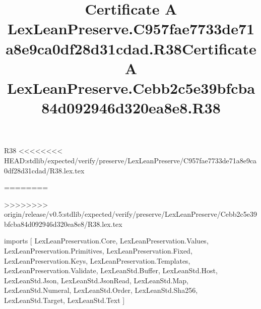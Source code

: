 \begin{lexlean}{R38}
<<<<<<<< HEAD:stdlib/expected/verify/preserve/LexLeanPreserve/C957fae7733de71a8e9ca0df28d31cdad/R38.lex.tex
\title{Certificate A LexLeanPreserve.C957fae7733de71a8e9ca0df28d31cdad.R38}
========
\title{Certificate A LexLeanPreserve.Cebb2c5e39bfcba84d092946d320ea8e8.R38}
>>>>>>>> origin/release/v0.5:stdlib/expected/verify/preserve/LexLeanPreserve/Cebb2c5e39bfcba84d092946d320ea8e8/R38.lex.tex
\begin{coremodule}
imports [
  LexLeanPreservation.Core,
  LexLeanPreservation.Values,
  LexLeanPreservation.Primitives,
  LexLeanPreservation.Fixed,
  LexLeanPreservation.Keys,
  LexLeanPreservation.Templates,
  LexLeanPreservation.Validate,
  LexLeanStd.Buffer,
  LexLeanStd.Host,
  LexLeanStd.Json,
  LexLeanStd.JsonRead,
  LexLeanStd.Map,
  LexLeanStd.Numeral,
  LexLeanStd.Order,
  LexLeanStd.Sha256,
  LexLeanStd.Target,
  LexLeanStd.Text
]


\end{coremodule}
\end{lexlean}
